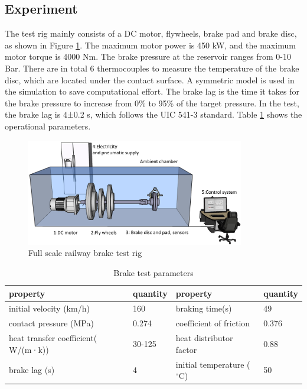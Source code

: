 \subsection*{Experiment}

The test rig mainly consists of a DC motor, flywheels, brake pad and brake disc, as shown in Figure \ref{fig:test rig}. The maximum motor power is 450 kW, and the maximum motor torque is 4000 Nm. The brake pressure at the reservoir ranges from 0-10 Bar. 
There are in total 6 thermocouples to measure the temperature of the brake disc, which are located under the contact surface. A symmetric model is used in the simulation to save computational effort. The brake lag is the time it takes for the brake pressure to increase from 0\% to 95\% of the target pressure. In the test, the brake lag is 4±0.2 s, which follows the UIC 541-3 standard. Table \ref{tab: operational parameters} shows the operational parameters.

\begin{figure}[h]
    \centering
    \includegraphics[width=0.85\textwidth]{book/chapters/zhang/graphics/test_rig.png}
    \caption{Full scale railway brake test rig}
    \label{fig:test rig}
\end{figure}

\begin{table}[h]
    \centering
    \begin{tabular}{llll} %
        \toprule
        \textbf{property} & \textbf{quantity} & \textbf{property} & \textbf{quantity}\\ %
        \midrule
        initial velocity (km/h)             & 160       &braking time(s)          & 49 \\
        contact pressure (MPa)              & 0.274      &coefficient of friction  & 0.376 \\
        heat transfer coefficient( W/(m·k)) & 30-125    &heat distributor factor  & 0.88 \\
        brake lag (s)                       & 4         &initial temperature ($^\circ\text{C}$) & 50\\
       
        \bottomrule
    \end{tabular}
    \caption{Brake test parameters}
    \label{tab: operational parameters}
\end{table}

